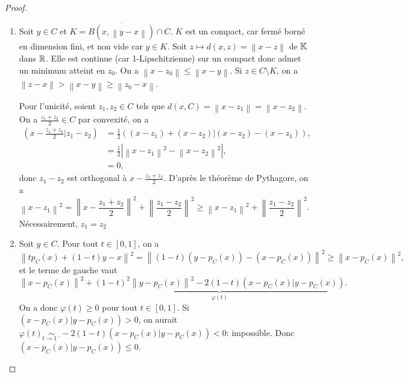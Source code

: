 \documentclass[12pt]{article}
\begin{document}
\begin{proof}
	\phantom{}
	\begin{enumerate}
		\item Soit $y\in C$ et $K=\overline{B(x,\left\lVert y-x\right\rVert)}\cap C$. $K$ est un compact, car fermé borné en dimension fini, et non vide car $y\in K$. Soit $z\mapsto d(x,z)=\left\lVert x-z\right\rVert$ de $\mathbb{K}$ dans $\mathbb{R}$. Elle est continue (car 1-Lipschitzienne) sur un compact donc admet un minimum atteint en $z_0$. On a $\left\lVert x-z_0\right\rVert\leqslant\left\lVert x-y \right\rVert$. Si $z\in C\setminus K$, on a $\left\lVert z-x\right\rVert>\left\lVert x-y\right\rVert\geqslant\left\lVert z_0-x\right\rVert$.
		
		Pour l'unicité, soient $z_1,z_2\in C$ tels que $d(x,C)=\left\lVert x-z_1\right\rVert=\left\lVert x-z_2\right\rVert$. On a $\frac{z_1+z_2}{2}\in C$ par convexité, on a
		\begin{align}
			\left(x-\frac{z_1+z_2}{2}|z_1-z_2\right)
			&=\frac{1}{2}\left((x-z_1)+(x-z_2)|(x-z_2)-(x-z_1)\right),\\
			&=\frac{1}{2}\left\lvert\left\lVert x-z_1\right\rVert^{2}-\left\lVert x-z_2\right\rVert^{2}\right\rvert,\\
			&=0,
		\end{align}
		donc $z_1-z_2$ est orthogonal à $x-\frac{z_1+z_2}{2}$. D'après le théorème de Pythagore, on a 
		\begin{equation}
			\left\lVert x-z_1\right\rVert^{2}=\left\lVert x-\frac{z_1+z_2}{2}\right\rVert^{2}+\left\lVert \frac{z_1-z_2}{2}\right\rVert^{2}\geqslant\left\lVert x-z_1\right\rVert^{2}+\left\lVert \frac{z_1-z_2}{2}\right\rVert^{2}.
		\end{equation}
		Nécessairement, $z_1=z_2$

		\item Soit $y\in C$. Pour tout $t\in[0,1]$, on a 
		\begin{equation}
			\left\lVert tp_C(x)+(1-t)y-x\right\rVert^{2}=\left\lVert (1-t)(y-p_C(x))-(x-p_C(x))\right\rVert^{2}\geqslant\left\lVert x-p_C(x)\right\rVert^{2},
		\end{equation}
		et le terme de gauche vaut 
		\begin{equation}
			\left\lVert x-p_C(x)\right\rVert^{2}+\underbrace{(1-t)^{2}\left\lVert y-p_C(x)\right\rVert^{2}-2(1-t)\left(x-p_C(x)|y-p_C(x)\right)}_{\varphi(t)}.
		\end{equation}
		On a donc $\varphi(t)\geqslant0$ pour tout $t\in[0,1]$. Si $(x-p_C(x)|y-p_C(x))>0$, on aurait $\varphi(t)\underset{t\to1^{-}}{\sim}-2(1-t)(x-p_C(x)|y-p_C(x))<0$: impossible. Donc $(x-p_C(x)|y-p_C(x))\leqslant0$.


\end{enumerate}
\end{proof}
\end{document}
